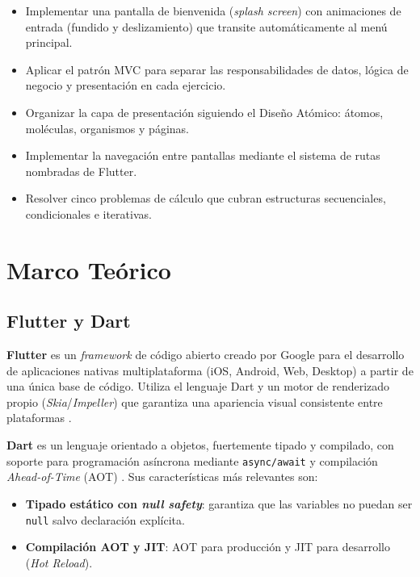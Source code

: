 \documentclass[12pt,a4paper]{article}
\begin{document}
\begin{itemize}
  \item Implementar una pantalla de bienvenida (\textit{splash screen}) con animaciones de entrada (fundido y deslizamiento) que transite automáticamente al menú principal.
  \item Aplicar el patrón MVC para separar las responsabilidades de datos, lógica de negocio y presentación en cada ejercicio.
  \item Organizar la capa de presentación siguiendo el Diseño Atómico: átomos, moléculas, organismos y páginas.
  \item Implementar la navegación entre pantallas mediante el sistema de rutas nombradas de Flutter.
  \item Resolver cinco problemas de cálculo que cubran estructuras secuenciales, condicionales e iterativas.
\end{itemize}

\section{Marco Teórico}

\subsection{Flutter y Dart}

\textbf{Flutter} es un \textit{framework} de código abierto creado por Google para el desarrollo de aplicaciones nativas multiplataforma (iOS, Android, Web, Desktop) a partir de una única base de código. Utiliza el lenguaje Dart y un motor de renderizado propio (\textit{Skia}/\textit{Impeller}) que garantiza una apariencia visual consistente entre plataformas \cite{flutter2024}.

\textbf{Dart} es un lenguaje orientado a objetos, fuertemente tipado y compilado, con soporte para programación asíncrona mediante \texttt{async/await} y compilación \textit{Ahead-of-Time} (AOT) \cite{dart2024}. Sus características más relevantes son:

\begin{itemize}
  \item \textbf{Tipado estático con \textit{null safety}}: garantiza que las variables no puedan ser \texttt{null} salvo declaración explícita.
  \item \textbf{Compilación AOT y JIT}: AOT para producción y JIT para desarrollo (\textit{Hot Reload}).
\end{itemize}
\end{document}
